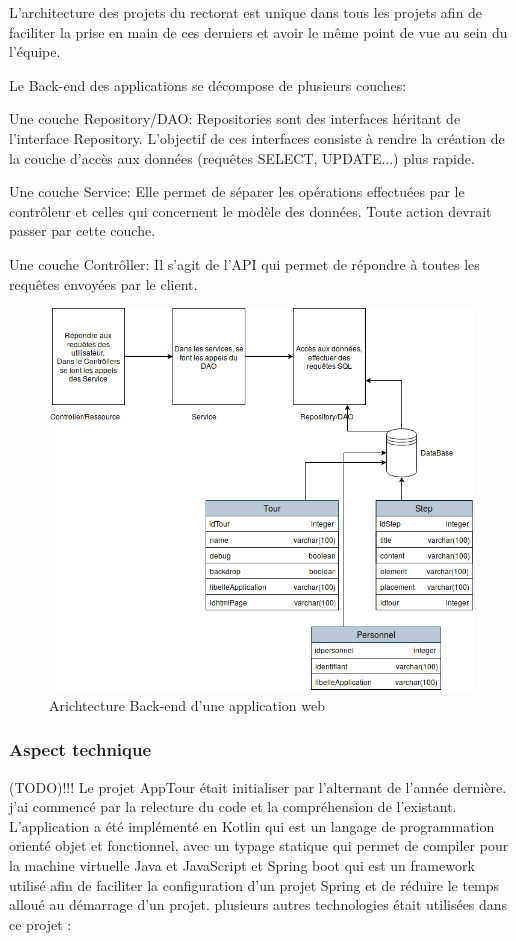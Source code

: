 \documentclass[12pt]{article}
\begin{document}
L'architecture des projets du rectorat est unique dans tous les projets afin  de faciliter la prise en main de ces derniers et avoir le même point de vue au sein du l'équipe.

Le Back-end des applications se décompose de plusieurs couches: \newline

Une couche Repository/DAO: Repositories sont des interfaces héritant de l'interface Repository. L'objectif de ces interfaces consiste à rendre la création de la couche d'accès aux données (requêtes SELECT, UPDATE...) plus rapide.\newline


Une couche Service: Elle permet de séparer les opérations effectuées par le contrôleur et celles qui concernent le modèle des données. Toute action devrait passer par cette couche.\newline


Une couche Contrôller: Il s'agit de l'API qui permet de répondre à toutes les requêtes envoyées par le client. 

\begin{figure}[H]
	\centering
 		\includegraphics[width=1\textwidth]{diagrammes/ArchitectureProjet.png}
  		\caption{Arichtecture Back-end d'une application web}
	\end{figure}
\subsubsection{Aspect technique}
(TODO)!!!
 Le projet AppTour était initialiser par l'alternant de l'année dernière. j'ai commencé par la relecture du code et la compréhension de l'existant. L'application a été implémenté en Kotlin qui est un langage de programmation orienté objet et fonctionnel, avec un typage statique qui permet de compiler pour la machine virtuelle Java et JavaScript et Spring boot qui est un framework utilisé afin de faciliter la configuration d'un projet Spring et de réduire le temps alloué au démarrage d'un projet. plusieurs autres technologies était utilisées dans ce projet : 
 
\end{document}
